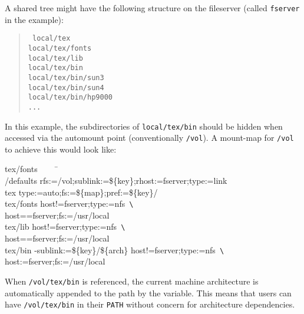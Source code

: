 A shared tree might have the following structure on the fileserver (called
{\tt fserver} in the example):
\begin{quote}\raggedright
\tt
local/tex \\
local/tex/fonts \\
local/tex/lib \\
local/tex/bin \\
local/tex/bin/sun3 \\
local/tex/bin/sun4 \\
local/tex/bin/hp9000 \\
...
\end{quote}
In this example, the subdirectories of {\tt local/tex/bin} should be
hidden when accessed via the automount point (conventionally {\tt /vol}).
A mount-map for {\tt /vol} to achieve this would look like:
{\tt\begin{tabbing}
tex/fonts\ \ \ \ \ \= \kill \\
/defaults          \> rfs:=/vol;sublink:=\$\{key\};rhost:=fserver;type:=link\\
tex                \> type:=auto;fs:=\$\{map\};pref:=\$\{key\}/\\
tex/fonts          \> host!=fserver;type:=nfs\ {\verb+\+}\\
                   \> host==fserver;fs:=/usr/local \\
tex/lib            \> host!=fserver;type:=nfs\ {\verb+\+}\\
                   \> host==fserver;fs:=/usr/local \\
tex/bin            \> -sublink:=\$\{key\}/\$\{arch\} host!=fserver;type:=nfs\ {\verb+\+}\\
                   \> host:=fserver;fs:=/usr/local
\end{tabbing}}
When {\tt /vol/tex/bin} is referenced, the current machine architecture
is automatically appended to the path by the  variable.
This means that users can have {\tt /vol/tex/bin} in their {\tt PATH}
without concern for architecture dependencies.

